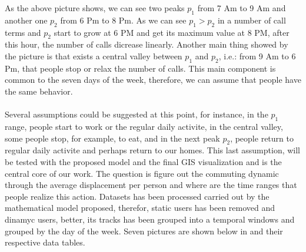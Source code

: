 As the above picture shows, we can see two peaks $p_1$ from 7 Am to 9 Am and another one $p_2$ from 6 Pm to 8 Pm. As we can see $p_1 > p_2$ in a number of call terms and $p_2$ start to grow at 6 PM and get its maximum value at 8 PM, after this hour, the number of calls dicrease linearly. Another main thing showed by the picture is that exists a central valley between $p_1$ and $p_2$, i.e.:  from 9 Am to 6 Pm, that people stop or relax the number of calls. 
This main component is common to the seven days of the week, therefore, we can assume that people have the same behavior.
\\
\\
Several assumptions could be suggested at this point, for instance, in the $p_1$ range, people start to work or the regular daily activite, in the central valley, some people stop, for example, to eat, and in the next peak $p_2$, people return to regular daily activite and perhaps return to our homes. This last assumption, will be tested with the proposed model and the final GIS visualization and is the central core of our work. The question is figure out the commuting dynamic through the average displacement per person and where are the time ranges that people realize this action.
Datasets has been processed carried out by the mathematical model proposed, therefor, static users has been removed and dinamyc users, better, its tracks has been grouped into a temporal windows and grouped by the day of the week. Seven pictures are shown below in and their respective data tables.


\begin{figure}[ht]
\centering
{}
\label{fig:fig1}
\end{figure}




